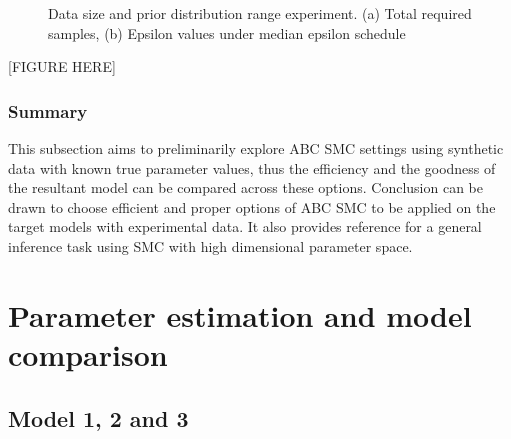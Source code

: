 \documentclass[12pt,a4paper]{report}
\begin{document}
\begin{figure}
    \begin{center}
    \end{center}
    
    \caption[Data size and prior distribution range experiment]%
        {Data size and prior distribution range experiment. (a) Total required samples, (b) Epsilon values under median epsilon schedule}
    \label{fig:size}
    
\end{figure}

[FIGURE HERE]


\subsubsection{Summary} This subsection aims to preliminarily explore ABC SMC settings using synthetic data with known true parameter values, thus the efficiency and the goodness of the resultant model can be compared across these options. Conclusion can be drawn to choose efficient and proper options of ABC SMC to be applied on the target models with experimental data. It also provides reference for a general inference task using SMC with high dimensional parameter space.








\section{Parameter estimation and model comparison}

\subsection{Model 1, 2 and 3}
\end{document}

